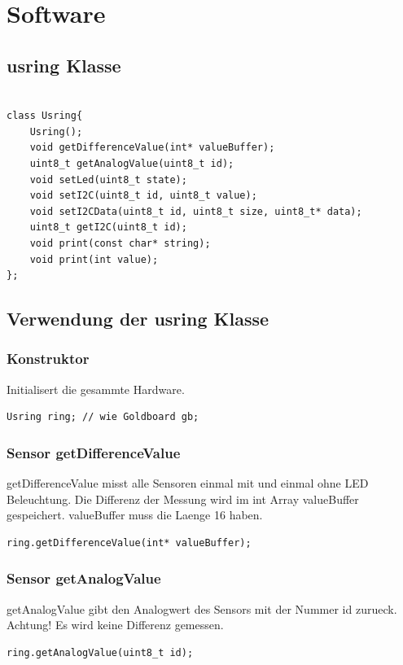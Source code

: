 \documentclass{article}
\begin{document}




\section{Software}

\subsection{usring Klasse}


\begin{lstlisting}

class Usring{
	Usring();
	void getDifferenceValue(int* valueBuffer);
	uint8_t getAnalogValue(uint8_t id);
	void setLed(uint8_t state);
	void setI2C(uint8_t id, uint8_t value);
	void setI2CData(uint8_t id, uint8_t size, uint8_t* data);
	uint8_t getI2C(uint8_t id);
	void print(const char* string);
	void print(int value);
};

\end{lstlisting}

\subsection{Verwendung der usring Klasse}


\subsubsection{Konstruktor}

Initialisert die gesammte Hardware.
\begin{lstlisting}
Usring ring; // wie Goldboard gb;
\end{lstlisting}


\subsubsection{Sensor getDifferenceValue}
getDifferenceValue misst alle Sensoren einmal mit und einmal ohne LED Beleuchtung.
Die Differenz der Messung wird im int Array valueBuffer gespeichert. 
valueBuffer muss die Laenge 16 haben.
\begin{lstlisting}
ring.getDifferenceValue(int* valueBuffer);
\end{lstlisting}


\subsubsection{Sensor getAnalogValue}
getAnalogValue gibt den Analogwert des Sensors mit der Nummer id zurueck.
Achtung! Es wird keine Differenz gemessen.
\begin{lstlisting}
ring.getAnalogValue(uint8_t id);
\end{lstlisting}
\end{document}
